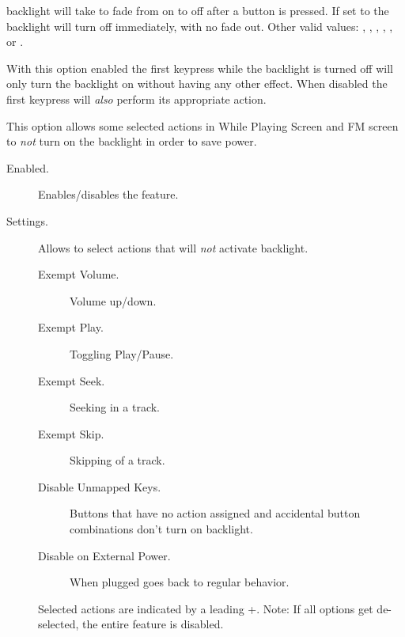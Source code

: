 \begin{description}
\begin{description}
{{        backlight will take to fade from on to off after a button is pressed. If
        set to  the backlight will turn off immediately, with no
        fade out. Other valid values: , ,
        , , ,  or
        .
      }
      \item[First Keypress Enables Backlight Only.]
      With this option enabled the first keypress while the backlight is turned
      off will only turn the backlight on without having any other effect. When
      disabled the first keypress will \emph{also} perform its appropriate action.

      \item[\label{ref:selectivebacklight}Backlight Exemptions]
       This option allows some selected actions in While Playing Screen and
       FM screen to \emph{not} turn on the backlight in order to save power.
      \begin{description}
        \item[Enabled.]
        Enables/disables the feature.

        \item[Settings.]
        Allows to select actions that will \emph{not} activate backlight.
                \begin{description}
                \item[Exempt Volume.]
                Volume up/down.
                \item[Exempt Play.]
                Toggling Play/Pause.
                \item[Exempt Seek.]
                Seeking in a track.
                \item[Exempt Skip.]
                Skipping of a track.
                \item[Disable Unmapped Keys.]
                Buttons that have no action assigned and accidental button
                    combinations don't turn on backlight.
                \item[Disable on External Power.]
                When plugged goes back to regular behavior.
                \end{description}
        Selected actions are indicated by a leading +.
        Note: If all options get de-selected, the entire feature is disabled.
        \end{description}



}
\end{description}
\end{description}
